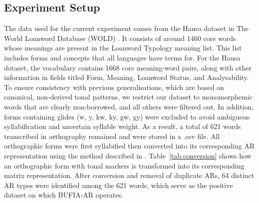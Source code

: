 \subsection{Experiment Setup}
The data used for the current experiment comes from the Hausa dataset
\citep{wold-4} in The World Loanword Database (WOLD) \citep{wold}. It
consists of around 1460 core words whose meanings are present in the
Loanword Typology meaning list. This list includes forms and concepts
that all languages have terms for. For the Hausa dataset, the
vocabulary contains 1668 core meaning-word pairs, along with other
information in fields titled Form, Meaning, Loanword Status, and
Analysability. To ensure consistency with previous generalisations, 
which are based on canonical, non-derived tonal patterns,
we restrict our dataset to monomorphemic words that are clearly 
non-borrowed, and all others were filtered out. In addition, forms 
containing glides (\textipa{\texthtk}w, \textipa{\texthtk}y, kw, ky, gw, gy) 
were excluded to avoid 
ambiguous syllabification and uncertain syllable weight.
As a result, a total of 621 words transcribed in orthography
remained and were stored in a .csv file.
All orthographic forms were first syllabified \citep{kodner2016} then
converted into its corresponding AR representation using the method
described in \citet{jardine2015concatenation}. 
Table~\ref{tab.conversion} shows how an orthographic form with
tonal markers is transformed into its corresponding matrix
representation. After conversion and removal of duplicate ARs, 64
distinct AR types were identified among the 621 words, which serve as
the positive dataset on which BUFIA-AR operates.
